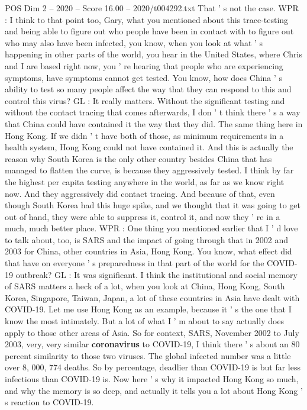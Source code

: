 \begin{textsample}{POS Dim 2 – 2020 – Score 16.00 – 2020/t004292.txt}
That ' s not the case.
WPR : I think to that point too, Gary, what you mentioned about this trace-testing and being able to figure out who people have been in contact with to figure out who may also have been infected, you know, when you look at what ' s happening in other parts of the world, you hear in the United States, where Chris and I are based right now, you ' re hearing that people who are experiencing symptoms, have symptoms cannot get tested.
You know, how does China ' s ability to test so many people affect the way that they can respond to this and control this virus?
GL : It really matters.
Without the significant testing and without the contact tracing that comes afterwards, I don ' t think there ' s a way that China could have contained it the way that they did.
The same thing here in Hong Kong.
If we didn ' t have both of those, as minimum requirements in a health system, Hong Kong could not have contained it.
And this is actually the reason why South Korea is the only other country besides China that has managed to flatten the curve, is because they aggressively tested.
I think by far the highest per capita testing anywhere in the world, as far as we know right now.
And they aggressively did contact tracing.
And because of that, even though South Korea had this huge spike, and we thought that it was going to get out of hand, they were able to suppress it, control it, and now they ' re in a much, much better place.
WPR : One thing you mentioned earlier that I ' d love to talk about, too, is SARS and the impact of going through that in 2002 and 2003 for China, other countries in Asia, Hong Kong.
You know, what effect did that have on everyone ' s preparedness in that part of the world for the COVID-19 outbreak?
GL : It was significant.
I think the institutional and social memory of SARS matters a heck of a lot, when you look at China, Hong Kong, South Korea, Singapore, Taiwan, Japan, a lot of these countries in Asia have dealt with COVID-19.
Let me use Hong Kong as an example, because it ' s the one that I know the most intimately.
But a lot of what I ' m about to say actually does apply to those other areas of Asia.
So for context, SARS, November 2002 to July 2003, very, very similar \textbf{coronavirus} to COVID-19, I think there ' s about an 80 percent similarity to those two viruses.
The global infected number was a little over 8, 000, 774 deaths.
So by percentage, deadlier than COVID-19 is but far less infectious than COVID-19 is.
Now here ' s why it impacted Hong Kong so much, and why the memory is so deep, and actually it tells you a lot about Hong Kong ' s reaction to COVID-19.

\end{textsample}
